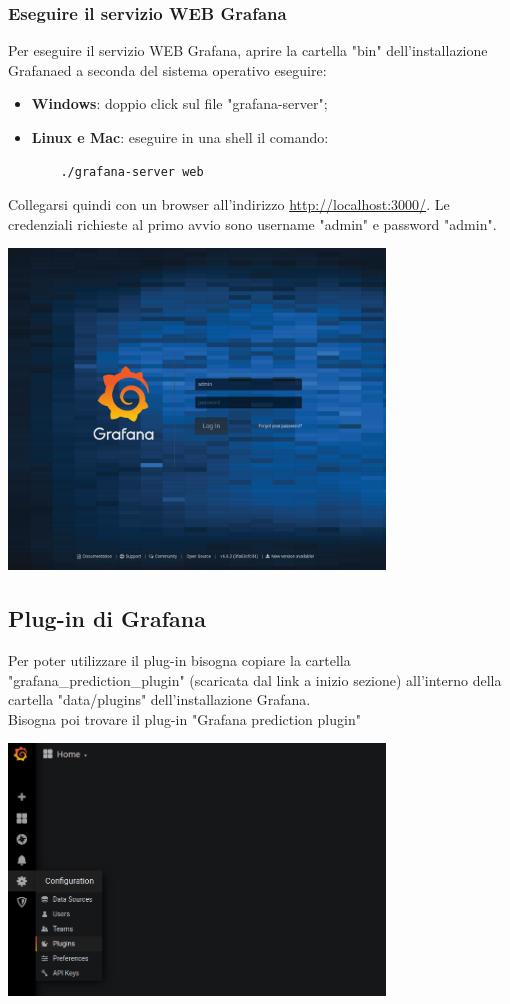 \subsubsection{Eseguire il servizio WEB Grafana} Per eseguire il servizio WEB Grafana\glo, aprire la cartella "bin" dell'installazione Grafana\glosp ed a seconda del sistema operativo eseguire:
\begin{itemize}
	\item \textbf{Windows}: doppio click sul file "grafana-server";
	\item \textbf{Linux e Mac}: eseguire in una shell il comando:
	\begin{verbatim}
	./grafana-server web
	\end{verbatim}
\end{itemize}
Collegarsi quindi con un browser all'indirizzo \url{http://localhost:3000/}. Le credenziali richieste al primo avvio sono username "admin" e password "admin".
\begin{center}
	\includegraphics[width=10cm,height=\textheight,keepaspectratio]{img/grafana-login.png}
\end{center}

\subsection{Plug-in di Grafana}
Per poter utilizzare il plug-in bisogna copiare la cartella "grafana\_prediction\_plugin" (scaricata dal link a inizio sezione) all'interno della cartella "data/plugins" dell'installazione Grafana\glo. \\
Bisogna poi trovare il plug-in "Grafana prediction plugin"
\begin{center}
	\includegraphics[width=10cm]{img/inserimento-plugin1.png}
\end{center}

